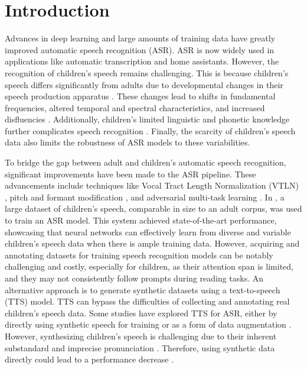 \section{Introduction}
Advances in deep learning and large amounts of training data have greatly improved automatic speech recognition (ASR). ASR is now widely used in applications like automatic transcription and home assistants. However, the recognition of children's speech remains challenging. This is because children's speech differs significantly from adults due to developmental changes in their speech production apparatus \cite{asr-review}. These changes lead to shifts in fundamental frequencies, altered temporal and spectral characteristics, and increased disfluencies \cite{Acoustic_change_children,language_children}. Additionally, children's limited linguistic and phonetic knowledge further complicates speech recognition \cite{linguistic-children}. Finally, the scarcity of children's speech data also limits the robustness of ASR models to these variabilities.

To bridge the gap between adult and children's automatic speech recognition, significant improvements have been made to the ASR pipeline. These advancements include techniques like Vocal Tract Length Normalization (VTLN) \cite{VTLN}, pitch and formant modification \cite{pitchnorm}, and adversarial multi-task learning \cite{adversarial-adapt1}. %
In \cite{liao2015large}, a large dataset of children's speech, comparable in size to an adult corpus, was used to train an ASR model. This system achieved state-of-the-art performance, showcasing that neural networks can effectively learn from diverse and variable children's speech data when there is ample training data. However,
acquiring and annotating datasets for training speech recognition models can be notably challenging and costly, especially for children, as their attention span is limited, and they may not consistently follow prompts during reading tasks. An alternative approach is to generate synthetic datasets using a text-to-speech (TTS) model. TTS can bypass the difficulties of collecting and annotating real children's speech data. Some studies have explored TTS for ASR, either by directly using synthetic speech for training or as a form of data augmentation \cite{laptev2020you}. However, synthesizing children's speech is challenging due to their inherent substandard and imprecise pronunciation \cite{wang2021towards}. Therefore, using synthetic data directly could lead to a performance decrease \cite{wang2021towards, hu2022synt++}. %


